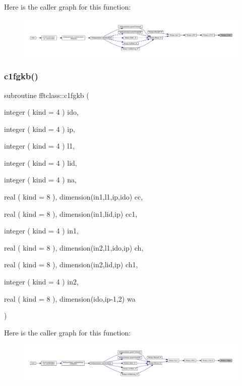 Here is the caller graph for this function\+:\nopagebreak
\begin{figure}[H]
\begin{center}
\leavevmode
\includegraphics[width=350pt]{namespacefftclass_a21d2647f4c2392ed5498288f99a3203c_icgraph}
\end{center}
\end{figure}
\mbox{\label{namespacefftclass_af3a0a7ee1c2b801d9ff55c016cdc13f4}} 
\subsubsection{\texorpdfstring{c1fgkb()}{c1fgkb()}}
{\footnotesize\ttfamily subroutine fftclass\+::c1fgkb (\begin{DoxyParamCaption}\item[{integer ( kind = 4 )}]{ido,  }\item[{integer ( kind = 4 )}]{ip,  }\item[{integer ( kind = 4 )}]{l1,  }\item[{integer ( kind = 4 )}]{lid,  }\item[{integer ( kind = 4 )}]{na,  }\item[{real ( kind = 8 ), dimension(in1,l1,ip,ido)}]{cc,  }\item[{real ( kind = 8 ), dimension(in1,lid,ip)}]{cc1,  }\item[{integer ( kind = 4 )}]{in1,  }\item[{real ( kind = 8 ), dimension(in2,l1,ido,ip)}]{ch,  }\item[{real ( kind = 8 ), dimension(in2,lid,ip)}]{ch1,  }\item[{integer ( kind = 4 )}]{in2,  }\item[{real ( kind = 8 ), dimension(ido,ip-\/1,2)}]{wa }\end{DoxyParamCaption})}

Here is the caller graph for this function\+:\nopagebreak
\begin{figure}[H]
\begin{center}
\leavevmode
\includegraphics[width=350pt]{namespacefftclass_af3a0a7ee1c2b801d9ff55c016cdc13f4_icgraph}
\end{center}
\end{figure}
\mbox{\label{namespacefftclass_aa48f7f35412e5994c6fe459ad6f8c46d}} 
